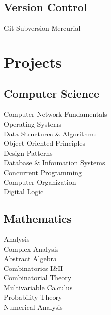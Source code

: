 \documentclass[]{cls}
\begin{document}
\begin{minipage}[t]{0.33\textwidth}
\subsection{Version Control}
Git \textbullet{}
Subversion \textbullet{}
Mercurial

\sectionsep


\section{Projects}
\subsection{Computer Science}
Computer Network Fundamentals\\
Operating Systems\\
Data Structures \& Algorithms\\
Object Oriented Principles\\
Design Patterns\\
Database \& Information Systems\\
Concurrent Programming\\
Computer Organization\\
Digital Logic
\sectionsep
\subsection{Mathematics}
Analysis\\
Complex Analysis\\
Abstract Algebra\\
Combinatorics $\mathrm{I \& II}$\\
Combinatorial Theory\\
Multivariable Calculus\\
Probability Theory\\
Numerical Analysis

%
%

\end{minipage} 
\hfill
\end{document}
